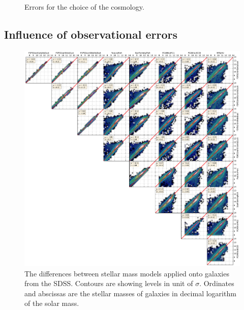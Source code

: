\begin{figure}[htb]
    \centering
    \begin{minipage}{0.49\linewidth}
    \end{minipage}
    \begin{minipage}{0.49\linewidth}
    \end{minipage}
    \begin{minipage}{0.49\linewidth}
    \end{minipage}
    \caption{Errors for the choice of the
    cosmology.\label{fig:bias_disp_cosmology}}
\end{figure}

\subsection{Influence of observational errors}

\begin{figure}[htb]
    \centering
    \includegraphics[width=\linewidth]{figures/maggie/stellar_mass_models.pdf}
    \caption{The differences between stellar mass models applied onto galaxies
    from the SDSS\@. Contours are showing levels in unit of $\sigma$. Ordinates
and abscissas are the stellar masses of galaxies in decimal logarithm of the
solar mass.\label{fig:stellar_mass_models}}
\end{figure}

